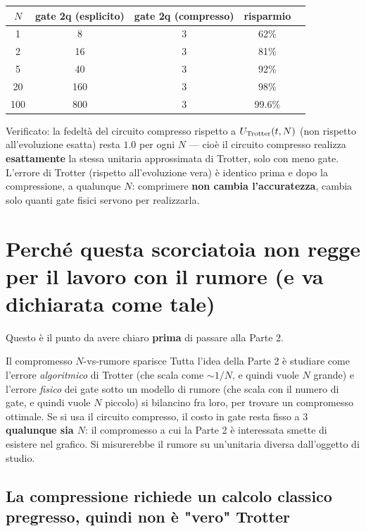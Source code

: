 \documentclass[11pt,a4paper]{article}
\begin{document}
\begin{center}
\renewcommand{\arraystretch}{1.25}
\begin{tabular}{@{}ccccc@{}}
\toprule
\rowcolor{inkblue!10}
$N$ & gate 2q (esplicito) & gate 2q (compresso) & risparmio & \\
\midrule
1 & 8 & 3 & 62\% & \\
2 & 16 & 3 & 81\% & \\
5 & 40 & 3 & 92\% & \\
20 & 160 & 3 & 98\% & \\
100 & 800 & 3 & 99.6\% & \\
\bottomrule
\end{tabular}
\end{center}

Verificato: la fedeltà del circuito compresso rispetto a
$U_{\rm Trotter}(t,N)$ (non rispetto all'evoluzione esatta) resta
$1.0$ per ogni $N$ --- cioè il circuito compresso realizza
\textbf{esattamente} la stessa unitaria approssimata di Trotter, solo
con meno gate. L'errore di Trotter (rispetto all'evoluzione vera) è
identico prima e dopo la compressione, a qualunque $N$: comprimere
\textbf{non cambia l'accuratezza}, cambia solo quanti gate fisici
servono per realizzarla.

\section{Perché questa scorciatoia non regge per il lavoro con il rumore (e va dichiarata come tale)}

Questo è il punto da avere chiaro \textbf{prima} di passare alla Parte
2.

\begin{warnbox}{Il compromesso $N$-vs-rumore sparisce}
Tutta l'idea della Parte 2 è studiare come l'errore \emph{algoritmico}
di Trotter (che scala come $\sim1/N$, e quindi vuole $N$ grande) e
l'errore \emph{fisico} dei gate sotto un modello di rumore (che scala
con il numero di gate, e quindi vuole $N$ piccolo) si bilancino fra
loro, per trovare un compromesso ottimale. Se si usa il circuito
compresso, il costo in gate resta fisso a 3 \textbf{qualunque sia $N$}:
il compromesso a cui la Parte 2 è interessata smette di esistere nel
grafico. Si misurerebbe il rumore su un'unitaria diversa dall'oggetto
di studio.
\end{warnbox}

\subsection*{La compressione richiede un calcolo classico pregresso, quindi non è "vero" Trotter}
\end{document}
